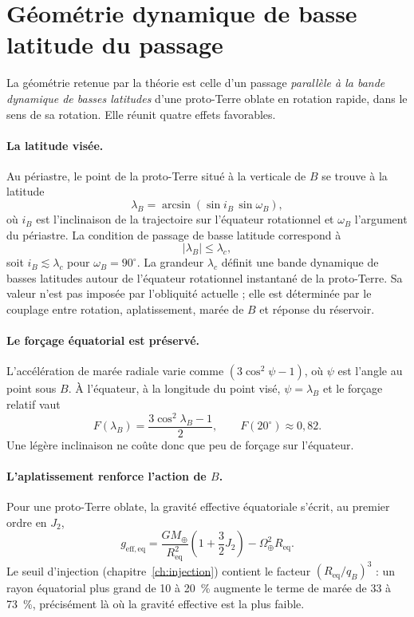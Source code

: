 \documentclass[11pt,a4paper,openany]{report}
\newcommand{\Mt}{M_{\oplus}}
\newcommand{\Req}{R_{\mathrm{eq}}}
\begin{document}
\section{Géométrie dynamique de basse latitude du passage}
\label{sec:basse-latitude}

La géométrie retenue par la théorie est celle d'un passage \emph{parallèle à la bande
dynamique de basses latitudes} d'une proto-Terre oblate en rotation rapide, dans le sens de sa rotation. Elle
réunit quatre effets favorables.

\paragraph{La latitude visée.}
Au périastre, le point de la proto-Terre situé à la verticale de $B$ se trouve à la latitude
\begin{equation}
\lambda_B=\arcsin\left(\sin i_B\,\sin\omega_B\right),
\label{eq:lambdaB}
\end{equation}
où $i_B$ est l'inclinaison de la trajectoire sur l'équateur rotationnel et $\omega_B$ l'argument
du périastre. La condition de passage de basse latitude correspond à
\begin{equation}
|\lambda_B|\le\lambda_c,
\label{eq:basse-latitude}
\end{equation}
soit $i_B\lesssim\lambda_c$ pour $\omega_B=90^\circ$. La grandeur $\lambda_c$ définit une bande
dynamique de basses latitudes autour de l'équateur rotationnel instantané de la proto-Terre. Sa
valeur n'est pas imposée par l'obliquité actuelle ; elle est déterminée par le couplage entre
rotation, aplatissement, marée de $B$ et réponse du réservoir.

\paragraph{Le forçage équatorial est préservé.}
L'accélération de marée radiale varie comme $(3\cos^2\psi-1)$, où $\psi$ est l'angle au point
sous $B$. À l'équateur, à la longitude du point visé, $\psi=\lambda_B$ et le forçage relatif vaut
\begin{equation}
F(\lambda_B)=\frac{3\cos^2\lambda_B-1}{2},
\qquad F(20^\circ)\approx0{,}82.
\label{eq:Flambda}
\end{equation}
Une légère inclinaison ne coûte donc que peu de forçage sur l'équateur.

\paragraph{L'aplatissement renforce l'action de \texorpdfstring{$B$}{B}.}
Pour une proto-Terre oblate, la gravité effective équatoriale s'écrit, au premier ordre en $J_2$,
\begin{equation}
g_{\mathrm{eff,eq}}=\frac{G\Mt}{\Req^2}\left(1+\frac32J_2\right)-\Omega_\oplus^2\Req.
\label{eq:geffJ2}
\end{equation}
Le seuil d'injection (chapitre~\ref{ch:injection}) contient le facteur $(\Req/q_B)^3$ : un rayon
équatorial plus grand de 10 à 20~\% augmente le terme de marée de 33 à 73~\%, précisément là
où la gravité effective est la plus faible.
\end{document}
